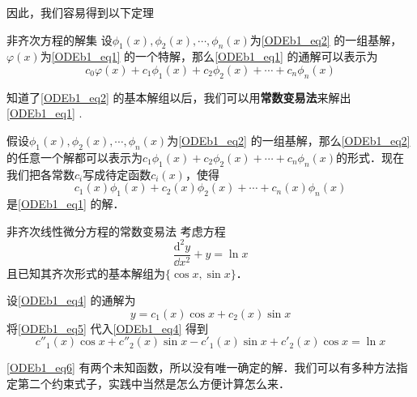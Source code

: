 因此，我们容易得到以下定理
\begin{theorem}{非齐次方程的解集}
设$\phi_1(x), \phi_2(x), \cdots, \phi_n(x)$为\autoref{ODEb1_eq2} 的一组基解，$\varphi(x)$为\autoref{ODEb1_eq1} 的一个特解，那么\autoref{ODEb1_eq1} 的通解可以表示为
\begin{equation}
c_0\varphi(x)+c_1\phi_1(x)+c_2\phi_2(x)+\cdots+c_n\phi_n(x)
\end{equation}
\end{theorem}

知道了\autoref{ODEb1_eq2} 的基本解组以后，我们可以用\textbf{常数变易法}来解出\autoref{ODEb1_eq1} .

假设$\phi_1(x), \phi_2(x), \cdots, \phi_n(x)$为\autoref{ODEb1_eq2} 的一组基解，那么\autoref{ODEb1_eq2} 的任意一个解都可以表示为$c_1\phi_1(x)+c_2\phi_2(x)+\cdots+c_n\phi_n(x)$的形式．现在我们把各常数$c_i$写成待定函数$c_i(x)$，使得
\begin{equation}
c_1(x)\phi_1(x)+c_2(x)\phi_2(x)+\cdots+c_n(x)\phi_n(x)
\end{equation}
是\autoref{ODEb1_eq1} 的解．

\begin{example}{非齐次线性微分方程的常数变易法}
考虑方程
\begin{equation}\label{ODEb1_eq4}
\frac{\mathrm{d}^2 y}{\dd x^2}+y=\ln x
\end{equation}
且已知其齐次形式的基本解组为$\{\cos x, \sin x\}$．

设\autoref{ODEb1_eq4} 的通解为
\begin{equation}\label{ODEb1_eq5}
y=c_1(x)\cos x+c_2(x)\sin x
\end{equation}
将\autoref{ODEb1_eq5} 代入\autoref{ODEb1_eq4} 得到
\begin{equation}\label{ODEb1_eq6}
c''_1(x)\cos x+c''_2(x)\sin x-c'_1(x)\sin x+c'_2(x)\cos x=\ln x
\end{equation}

\autoref{ODEb1_eq6} 有两个未知函数，所以没有唯一确定的解．我们可以有多种方法指定第二个约束式子，实践中当然是怎么方便计算怎么来．





\end{example}



















